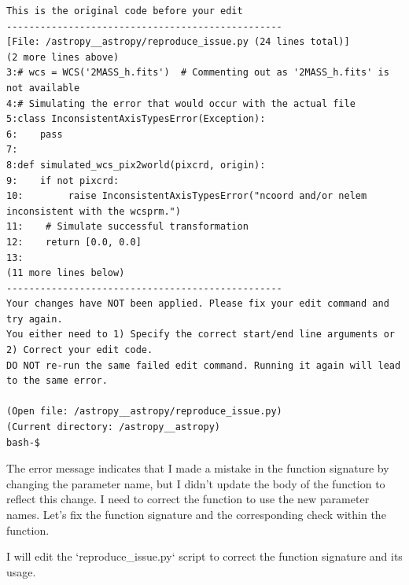 {\begin{observationbox}
\begin{Verbatim}[breaklines=true, breakanywhere=true]
This is the original code before your edit
-------------------------------------------------
[File: /astropy__astropy/reproduce_issue.py (24 lines total)]
(2 more lines above)
3:# wcs = WCS('2MASS_h.fits')  # Commenting out as '2MASS_h.fits' is not available
4:# Simulating the error that would occur with the actual file
5:class InconsistentAxisTypesError(Exception):
6:    pass
7:
8:def simulated_wcs_pix2world(pixcrd, origin):
9:    if not pixcrd:
10:        raise InconsistentAxisTypesError("ncoord and/or nelem inconsistent with the wcsprm.")
11:    # Simulate successful transformation
12:    return [0.0, 0.0]
13:
(11 more lines below)
-------------------------------------------------
Your changes have NOT been applied. Please fix your edit command and try again.
You either need to 1) Specify the correct start/end line arguments or 2) Correct your edit code.
DO NOT re-run the same failed edit command. Running it again will lead to the same error.

(Open file: /astropy__astropy/reproduce_issue.py)
(Current directory: /astropy__astropy)
bash-$
\end{Verbatim}
\end{observationbox}
\begin{agentbox}
The error message indicates that I made a mistake in the function signature by changing the parameter name, but I didn't update the body of the function to reflect this change. I need to correct the function to use the new parameter names. Let's fix the function signature and the corresponding check within the function.



I will edit the `reproduce\_issue.py` script to correct the function signature and its usage.


\end{agentbox}}
